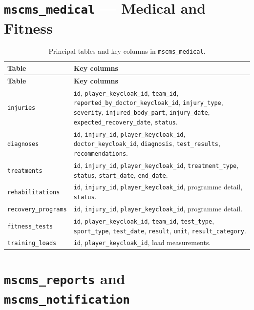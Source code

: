 \section{\texttt{mscms\_medical} --- Medical and Fitness}
\label{app:schema-medical}

\begin{longtable}{p{} p{}}
\caption{Principal tables and key columns in \texttt{mscms\_medical}.}
\label{tab:schema-medical}\\
\toprule
\textbf{Table} & \textbf{Key columns} \\
\midrule
\endfirsthead
\toprule
\textbf{Table} & \textbf{Key columns} \\
\midrule
\endhead
\bottomrule
\endlastfoot
\texttt{injuries} & \texttt{id}, \texttt{player\_keycloak\_id}, \texttt{team\_id}, \texttt{reported\_by\_doctor\_keycloak\_id}, \texttt{injury\_type}, \texttt{severity}, \texttt{injured\_body\_part}, \texttt{injury\_date}, \texttt{expected\_recovery\_date}, \texttt{status}. \\
\texttt{diagnoses} & \texttt{id}, \texttt{injury\_id}, \texttt{player\_keycloak\_id}, \texttt{doctor\_keycloak\_id}, \texttt{diagnosis}, \texttt{test\_results}, \texttt{recommendations}. \\
\texttt{treatments} & \texttt{id}, \texttt{injury\_id}, \texttt{player\_keycloak\_id}, \texttt{treatment\_type}, \texttt{status}, \texttt{start\_date}, \texttt{end\_date}. \\
\texttt{rehabilitations} & \texttt{id}, \texttt{injury\_id}, \texttt{player\_keycloak\_id}, programme detail, \texttt{status}. \\
\texttt{recovery\_programs} & \texttt{id}, \texttt{injury\_id}, \texttt{player\_keycloak\_id}, programme detail. \\
\texttt{fitness\_tests} & \texttt{id}, \texttt{player\_keycloak\_id}, \texttt{team\_id}, \texttt{test\_type}, \texttt{sport\_type}, \texttt{test\_date}, \texttt{result}, \texttt{unit}, \texttt{result\_category}. \\
\texttt{training\_loads} & \texttt{id}, \texttt{player\_keycloak\_id}, load measurements. \\
\end{longtable}

\section{\texttt{mscms\_reports} and \texttt{mscms\_notification}}
\label{app:schema-reports-notif}

